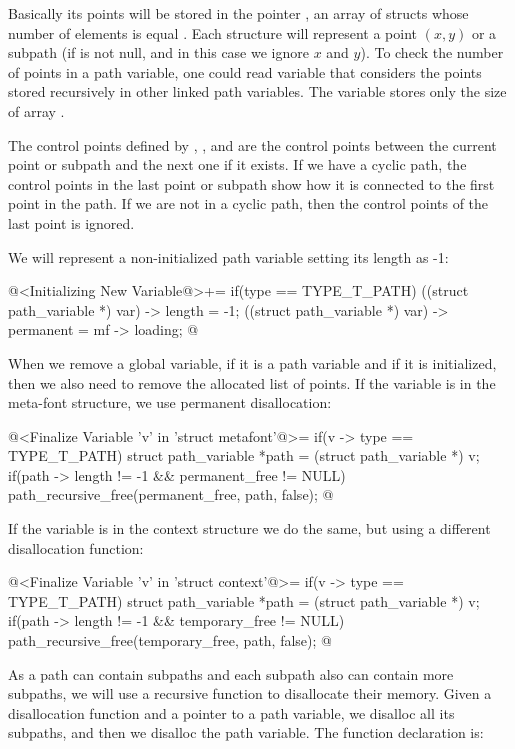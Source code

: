 Basically its points will be stored in the
pointer , an array of structs whose number of
elements is equal . Each structure will represent a
point $(x, y)$ or a subpath (if  is not null, and
in this case we ignore $x$ and $y$). To check the number of points in
a path variable, one could read variable 
that considers the points stored recursively in other linked path
variables. The variable  stores only the size of
array .

The control points defined
by , , 
and  are the control points between the current point
or subpath and the next one if it exists. If we have a cyclic path,
the control points in the last point or subpath show how it is
connected to the first point in the path. If we are not in a cyclic
path, then the control points of the last point is ignored.

We will represent a non-initialized path variable setting its length
as -1:

\iniciocodigo
@<Initializing New Variable@>+=
if(type == TYPE_T_PATH){
  ((struct path_variable *) var) -> length = -1;
  ((struct path_variable *) var) -> permanent = mf -> loading;
}
@
\fimcodigo

When we remove a global variable, if it is a path variable and if it
is initialized, then we also need to remove the allocated list of
points. If the variable is in the meta-font structure, we use
permanent disallocation:

\iniciocodigo
@<Finalize Variable 'v' in 'struct metafont'@>=
if(v -> type == TYPE_T_PATH){
  struct path_variable *path = (struct path_variable *) v;  
  if(path -> length != -1 && permanent_free != NULL)
    path_recursive_free(permanent_free, path, false);
}
@
\fimcodigo

If the variable is in the context structure we do the same, but using
a different disallocation function:

\iniciocodigo
@<Finalize Variable 'v' in 'struct context'@>=
if(v -> type == TYPE_T_PATH){
  struct path_variable *path = (struct path_variable *) v;
  if(path -> length != -1 && temporary_free != NULL)
    path_recursive_free(temporary_free, path, false);
}
@
\fimcodigo

As a path can contain subpaths and each subpath also can contain more
subpaths, we will use a recursive function to disallocate their
memory. Given a disallocation function and a pointer to a path
variable, we disalloc all its subpaths, and then we disalloc the path
variable. The function declaration is:

